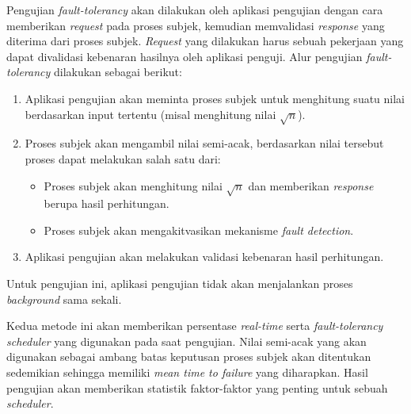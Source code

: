 Pengujian \textit{fault-tolerancy} akan dilakukan oleh aplikasi pengujian dengan cara memberikan \textit{request} pada proses subjek, kemudian memvalidasi \textit{response} yang diterima dari proses subjek.
\textit{Request} yang dilakukan harus sebuah pekerjaan yang dapat divalidasi kebenaran hasilnya oleh aplikasi penguji.
Alur pengujian \textit{fault-tolerancy} dilakukan sebagai berikut:
\begin{enumerate}
    \item Aplikasi pengujian akan meminta proses subjek untuk menghitung suatu nilai berdasarkan input tertentu (misal menghitung nilai $\sqrt{n}$).
    \item Proses subjek akan mengambil nilai semi-acak, berdasarkan nilai tersebut proses dapat melakukan salah satu dari:
        \begin{itemize}
            \item Proses subjek akan menghitung nilai $\sqrt{n}$ dan memberikan \textit{response} berupa hasil perhitungan.
            \item Proses subjek akan mengakitvasikan mekanisme \textit{fault detection}.
        \end{itemize}
    \item Aplikasi pengujian akan melakukan validasi kebenaran hasil perhitungan.
\end{enumerate}
Untuk pengujian ini, aplikasi pengujian tidak akan menjalankan proses \textit{background} sama sekali.

Kedua metode ini akan memberikan persentase \textit{real-time} serta \textit{fault-tolerancy} \textit{scheduler} yang digunakan pada saat pengujian.
Nilai semi-acak yang akan digunakan sebagai ambang batas keputusan proses subjek akan ditentukan sedemikian sehingga memiliki \textit{mean time to failure} yang diharapkan.
Hasil pengujian akan memberikan statistik faktor-faktor yang penting untuk sebuah \textit{scheduler}.

